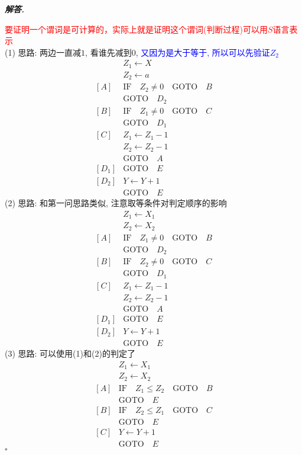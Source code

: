 \documentclass[10pt, a4paper, oneside]{ctexart}
\newenvironment{solution}{%
  \par\noindent\textbf{\textit{解答. }}\ignorespaces
}{%
  \hfill\ensuremath{\square}\par
}
\begin{document}
\begin{solution}
\textcolor{red}{要证明一个谓词是可计算的，实际上就是证明这个谓词(判断过程)可以用$S$语言表示}\\
(1) 思路: 两边一直减$1$, 看谁先减到$0$, \textcolor{blue}{又因为是大于等于, 所以可以先验证$Z_2$}
\begin{align*}
    &Z_1\leftarrow X\\
    &Z_2\leftarrow a\\
    [A]& \text{IF} \quad Z_2\neq 0 \quad \text{GOTO} \quad B\\
    &\text{GOTO}\quad  D_2\\
    [B]& \text{IF} \quad Z_1\neq 0 \quad \text{GOTO} \quad C\\
    &\text{GOTO}\quad  D_1\\
    [C]&Z_1\leftarrow Z_1-1\\
    &Z_2\leftarrow Z_2-1\\
    &\text{GOTO}\quad  A\\
    [D_1]&\text{GOTO}\quad  E\\
    [D_2]&Y\leftarrow Y+1\\
    &\text{GOTO}\quad  E
\end{align*}
(2) 思路: 和第一问思路类似, 注意取等条件对判定顺序的影响
\begin{align*}
    &Z_1\leftarrow X_1\\
    &Z_2\leftarrow X_2\\
    [A]& \text{IF} \quad Z_1\neq 0 \quad \text{GOTO} \quad B\\
    &\text{GOTO}\quad  D_2\\
    [B]& \text{IF} \quad Z_2\neq 0 \quad \text{GOTO} \quad C\\
    &\text{GOTO}\quad  D_1\\
    [C]&Z_1\leftarrow Z_1-1\\
    &Z_2\leftarrow Z_2-1\\
    &\text{GOTO}\quad  A\\
    [D_1]&\text{GOTO}\quad  E\\
    [D_2]&Y\leftarrow Y+1\\
    &\text{GOTO}\quad  E
\end{align*}
(3) 思路: 可以使用(1)和(2)的判定了
\begin{align*}
    &Z_1\leftarrow X_1\\
    &Z_2\leftarrow X_2\\
    [A]&\text{IF} \quad Z_1\leq Z_2 \quad \text{GOTO} \quad B\\
    &\text{GOTO}\quad  E\\
    [B]&\text{IF} \quad Z_2\leq Z_1 \quad \text{GOTO} \quad C\\
    &\text{GOTO}\quad  E\\
    [C]&Y\leftarrow Y+1\\
    &\text{GOTO}\quad  E
\end{align*}
\end{solution}
\end{document}
